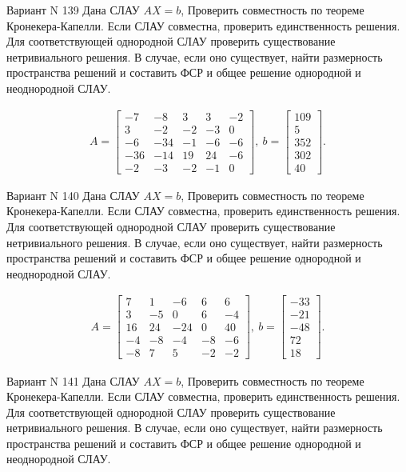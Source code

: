 \documentclass[11pt]{report}
\begin{document}
Вариант N 139
Дана СЛАУ $AX = b$,
Проверить совместность по теореме Кронекера-Капелли. Если СЛАУ совместна, проверить единственность решения.
Для соответствующей однородной СЛАУ проверить существование нетривиального решения. В случае, если оно существует,
найти размерность пространства решений и составить ФСР и общее решение однородной  и неоднородной СЛАУ.


\begin{align*}
 A = \left[\begin{matrix}-7 & -8 & 3 & 3 & -2\\3 & -2 & -2 & -3 & 0\\-6 & -34 & -1 & -6 & -6\\-36 & -14 & 19 & 24 & -6\\-2 & -3 & -2 & -1 & 0\end{matrix}\right],
\ b = \left[\begin{matrix}109\\5\\352\\302\\40\end{matrix}\right]. 
 \end{align*}

Вариант N 140
Дана СЛАУ $AX = b$,
Проверить совместность по теореме Кронекера-Капелли. Если СЛАУ совместна, проверить единственность решения.
Для соответствующей однородной СЛАУ проверить существование нетривиального решения. В случае, если оно существует,
найти размерность пространства решений и составить ФСР и общее решение однородной  и неоднородной СЛАУ.


\begin{align*}
 A = \left[\begin{matrix}7 & 1 & -6 & 6 & 6\\3 & -5 & 0 & 6 & -4\\16 & 24 & -24 & 0 & 40\\-4 & -8 & -4 & -8 & -6\\-8 & 7 & 5 & -2 & -2\end{matrix}\right],
\ b = \left[\begin{matrix}-33\\-21\\-48\\72\\18\end{matrix}\right]. 
 \end{align*}

Вариант N 141
Дана СЛАУ $AX = b$,
Проверить совместность по теореме Кронекера-Капелли. Если СЛАУ совместна, проверить единственность решения.
Для соответствующей однородной СЛАУ проверить существование нетривиального решения. В случае, если оно существует,
найти размерность пространства решений и составить ФСР и общее решение однородной  и неоднородной СЛАУ.
\end{document}
